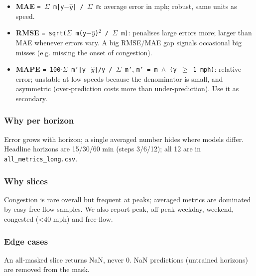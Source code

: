 \documentclass[10pt,a4paper]{article}
\begin{document}
\begin{itemize}[nosep,leftmargin=*]
\item \textbf{MAE} \texttt{= \ensuremath{\Sigma} m|y\ensuremath{-}\ensuremath{\hat{y}}| /\allowbreak{} \ensuremath{\Sigma} m}: average error in mph; robust, same units as speed.
\item \textbf{RMSE} \texttt{= sqrt(\ensuremath{\Sigma} m(y\ensuremath{-}\ensuremath{\hat{y}})\ensuremath{^{2}} /\allowbreak{} \ensuremath{\Sigma} m)}: penalises large errors more; larger than MAE whenever errors vary. A big RMSE/\allowbreak{}MAE gap signals occasional big misses (e.g. missing the onset of congestion).
\item \textbf{MAPE} \texttt{= 100\ensuremath{\cdot}\ensuremath{\Sigma} m'|y\ensuremath{-}\ensuremath{\hat{y}}|/\allowbreak{}y /\allowbreak{} \ensuremath{\Sigma} m'}, \texttt{m' = m \ensuremath{\wedge} (y \ensuremath{\geq} 1 mph)}: relative error; unstable at low speeds because the denominator is small, and asymmetric (over-prediction costs more than under-prediction). Use it as secondary.
\end{itemize}

\subsubsection*{Why per horizon}
Error grows with horizon; a single averaged number hides where models differ. Headline horizons are 15/\allowbreak{}30/\allowbreak{}60 min (steps 3/\allowbreak{}6/\allowbreak{}12); all 12 are in \texttt{all\_\allowbreak{}metrics\_\allowbreak{}long.csv}.

\subsubsection*{Why slices}
Congestion is rare overall but frequent at peaks; averaged metrics are dominated by easy free-flow samples. We also report peak, off-peak weekday, weekend, congested (<40 mph) and free-flow.

\subsubsection*{Edge cases}
An all-masked slice returns NaN, never 0. NaN predictions (untrained horizons) are removed from the mask.
\end{document}
